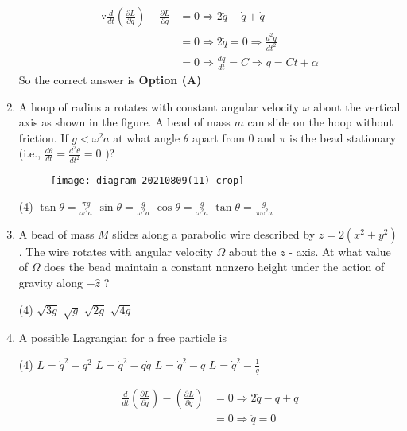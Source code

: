 \begin{enumerate}
\begin{answer}
\begin{align*}
		\because \frac{d}{d t}\left(\frac{\partial L}{\partial \dot{q}}\right)-\frac{\partial L}{\partial q}&=0
		\Rightarrow 2 \ddot{q}-\dot{q}+\dot{q}\\&=0 \Rightarrow 2 \ddot{q}=0 \Rightarrow \frac{d^{2} q}{d t^{2}}\\&=0 \Rightarrow \frac{d q}{d t}=C \Rightarrow q=C t+\alpha
		\end{align*}
		So the correct answer is \textbf{Option (A)}
	\end{answer}	
	\item A hoop of radius a rotates with constant angular velocity $\omega$ about the
	vertical axis as shown in the figure. A bead of mass $m$ can slide on the
	hoop without friction. If $g<\omega^{2} a$ at what angle $\theta$ apart from 0 and $\pi$ is the bead stationary (i.e., $\frac{d \theta}{d t}=\frac{d^{2} \theta}{d t^{2}}=0$ )?
	{}
	\begin{figure}[H]
		\centering
		\texttt{[image: diagram-20210809(11)-crop]}
		\caption{}
		\label{}
	\end{figure}
	\begin{tasks}(4)
		\task[\textbf{A.}] $\tan \theta=\frac{\pi g}{\omega^{2} a}$
		\task[\textbf{B.}] $\sin \theta=\frac{g}{\omega^{2} a}$
		\task[\textbf{C.}] $\cos \theta=\frac{g}{\omega^{2} a}$
		\task[\textbf{D.}] $\tan \theta=\frac{g}{\pi \omega^{2} a}$
	\end{tasks}
	\item A bead of mass $M$ slides along a parabolic wire described by $z=2\left(x^{2}+y^{2}\right)$. The wire rotates with angular velocity $\Omega$ about the $z$ - axis. At what value of $\Omega$ does the bead maintain a constant nonzero height under the action of gravity along $-\hat{z}$ ?
	{}
	\begin{tasks}(4)
		\task[\textbf{A.}] $\sqrt{3 g}$
		\task[\textbf{B.}] $\sqrt{g}$
		\task[\textbf{C.}] $\sqrt{2 g}$
		\task[\textbf{D.}] $\sqrt{4 g}$
	\end{tasks}
	\item A possible Lagrangian for a free particle is
	{}
	\begin{tasks}(4)
		\task[\textbf{A.}] $L=\dot{q}^{2}-q^{2}$
		\task[\textbf{B.}] $L=\dot{q}^{2}-q \dot{q}$
		\task[\textbf{C.}] $L=\dot{q}^{2}-q$
		\task[\textbf{D.}] $L=\dot{q}^{2}-\frac{1}{q}$
	\end{tasks}
	\begin{answer}
		\begin{align*}
		\frac{d}{d t}\left(\frac{\partial L}{\partial \dot{q}}\right)-\left(\frac{\partial L}{\partial q}\right)&=0 \Rightarrow 2 \ddot{q}-\dot{q}+\dot{q}\\&=0 \Rightarrow \ddot{q}=0

\end{align*}
\end{answer}
\end{enumerate}
